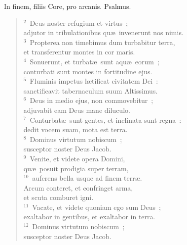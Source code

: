 \bchapter
\lettrine[lines=3,image=true,loversize=0.05,lraise=-0.03]{I}{}n finem, filiis Core, pro arcanis. Psalmus.
\begin{flushleft}\begin{verse}\vspace{6pt}${}^{2}$~Deus noster refugium et virtus~;\\ adjutor in tribulationibus qu\ae\ invenerunt nos nimis.\\
${}^{3}$~Propterea non timebimus dum turbabitur terra,\\ et transferentur montes in cor maris.\\
${}^{4}$~Sonuerunt, et turbat\ae\ sunt aqu\ae\ eorum~;\\ conturbati sunt montes in fortitudine ejus.\\
${}^{5}$~Fluminis impetus l\ae tificat civitatem Dei~:\\ sanctificavit tabernaculum suum Altissimus.\\
${}^{6}$~Deus in medio ejus, non commovebitur~;\\ adjuvabit eam Deus mane diluculo.\\
${}^{7}$~Conturbat\ae\ sunt gentes, et inclinata sunt regna~:\\ dedit vocem suam, mota est terra.\\
${}^{8}$~Dominus virtutum nobiscum~;\\ susceptor noster Deus Jacob.\\
${}^{9}$~Venite, et videte opera Domini,\\ qu\ae\ posuit prodigia super terram,\\
${}^{10}$~auferens bella usque ad finem terr\ae .\\ Arcum conteret, et confringet arma,\\ et scuta comburet igni.\\
${}^{11}$~Vacate, et videte quoniam ego sum Deus~;\\ exaltabor in gentibus, et exaltabor in terra.\\
${}^{12}$~Dominus virtutum nobiscum~;\\ susceptor noster Deus Jacob.\end{verse}\end{flushleft}



